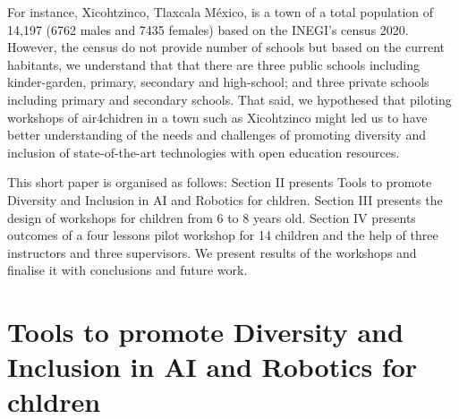 \documentclass[conference]{IEEEtran}
\begin{document}
For instance, Xicohtzinco, Tlaxcala M\'exico, is a town of a total population of 14,197 (6762 males and 7435 females) based on the INEGI's census 2020.
However, the census do not provide number of schools but based on the current habitants, we understand that that there are three public schools including kinder-garden, primary, secondary and high-school; and three private schools including primary and secondary schools. 
That said, we hypothesed that piloting workshops of air4chidren in a town such as Xicohtzinco might led us to have better understanding of the needs and challenges of promoting diversity and inclusion of state-of-the-art technologies with open education resources.

This short paper is organised as follows:
Section II presents Tools to promote Diversity and Inclusion in AI and Robotics for chldren.
Section III presents the design of workshops for children from 6 to 8 years old.
Section IV presents outcomes of a four lessons pilot workshop for 14 children and the help of three instructors and three supervisors. 
We present results of the workshops and finalise it with conclusions and future work.



\section{Tools to promote Diversity and Inclusion in AI and Robotics for chldren}
\end{document}
